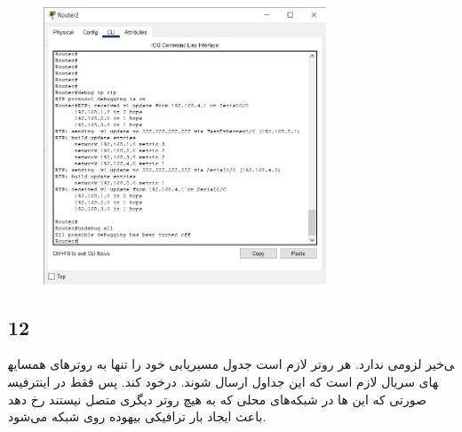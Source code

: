 \documentclass{article}
\begin{document}
\begin{figure}[H]
    \centering
    \includegraphics[width=0.75\textwidth]{figures/13.jpg}
    \caption{}
    \label{fig:fig1}
\end{figure}



\subsection{12}
خیر لزومی ندارد. هر روتر لازم است جدول مسیریابی خود را تنها به روترهای همسایه‎ی خود  کند. پس فقط در اینترفیس‎های سریال لازم است که این جداول ارسال شوند. در صورتی که این ها در شبکه‌های محلی که به هیچ روتر دیگری متصل نیستند رخ دهد باعث ایجاد بار ترافیکی بیهوده روی شبکه می‌شود.
\end{document}
